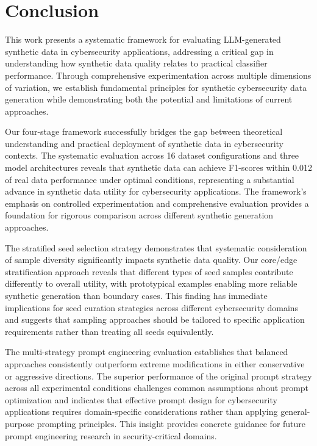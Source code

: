\section{Conclusion}
\label{sec:conclusion}

This work presents a systematic framework for evaluating LLM-generated synthetic data in cybersecurity applications, addressing a critical gap in understanding how synthetic data quality relates to practical classifier performance. Through comprehensive experimentation across multiple dimensions of variation, we establish fundamental principles for synthetic cybersecurity data generation while demonstrating both the potential and limitations of current approaches.

Our four-stage framework successfully bridges the gap between theoretical understanding and practical deployment of synthetic data in cybersecurity contexts. The systematic evaluation across 16 dataset configurations and three model architectures reveals that synthetic data can achieve F1-scores within 0.012 of real data performance under optimal conditions, representing a substantial advance in synthetic data utility for cybersecurity applications. The framework's emphasis on controlled experimentation and comprehensive evaluation provides a foundation for rigorous comparison across different synthetic generation approaches.

The stratified seed selection strategy demonstrates that systematic consideration of sample diversity significantly impacts synthetic data quality. Our core/edge stratification approach reveals that different types of seed samples contribute differently to overall utility, with prototypical examples enabling more reliable synthetic generation than boundary cases. This finding has immediate implications for seed curation strategies across different cybersecurity domains and suggests that sampling approaches should be tailored to specific application requirements rather than treating all seeds equivalently.

The multi-strategy prompt engineering evaluation establishes that balanced approaches consistently outperform extreme modifications in either conservative or aggressive directions. The superior performance of the original prompt strategy across all experimental conditions challenges common assumptions about prompt optimization and indicates that effective prompt design for cybersecurity applications requires domain-specific considerations rather than applying general-purpose prompting principles. This insight provides concrete guidance for future prompt engineering research in security-critical domains.

